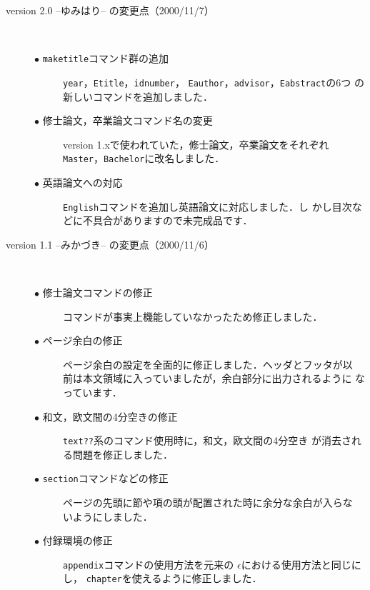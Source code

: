 \documentclass[mingoth]{kut-paper}		%
\begin{document}
\begin{description}
 \item[version 2.0 --ゆみはり-- の変更点（2000/11/7）]~
 \begin{description}
  \item[$\bullet$ \texttt{maketitle}コマンド群の追加]
			 \texttt{year}，\texttt{Etitle}，\texttt{idnumber}，
			 \texttt{Eauthor}，\texttt{advisor}，\texttt{Eabstract}の6つ
			 の新しいコマンドを追加しました．
  \item[$\bullet$ 修士論文，卒業論文コマンド名の変更]
			 version 1.xで使われていた，修士論文，卒業論文をそれぞれ
			 \texttt{Master}，\texttt{Bachelor}に改名しました．
  \item[$\bullet$ 英語論文への対応]
			 \texttt{English}コマンドを追加し英語論文に対応しました．し
			 かし目次などに不具合がありますので未完成品です．
 \end{description}
			
 \item[version 1.1 --みかづき-- の変更点（2000/11/6）]~
 \begin{description}
  \item[$\bullet$ 修士論文コマンドの修正]
			 コマンドが事実上機能していなかったため修正しました．
  \item[$\bullet$ ページ余白の修正]
			 ページ余白の設定を全面的に修正しました．ヘッダとフッタが以
			 前は本文領域に入っていましたが，余白部分に出力されるように
			 なっています．
  \item[$\bullet$ 和文，欧文間の4分空きの修正]
			 \texttt{text??}系のコマンド使用時に，和文，欧文間の4分空き
			 が消去される問題を修正しました\cite{bib:jnic}．
  \item[$\bullet$ \texttt{section}コマンドなどの修正]
			 ページの先頭に節や項の頭が配置された時に余分な余白が入らな
			 いようにしました．
  \item[$\bullet$ 付録環境の修正]
			 \texttt{appendix}コマンドの使用方法を元来の
			 $\epsilon$における使用方法と同じにし，
			 \texttt{chapter}を使えるように修正しました．
 \end{description}


\end{description}
\end{document}
